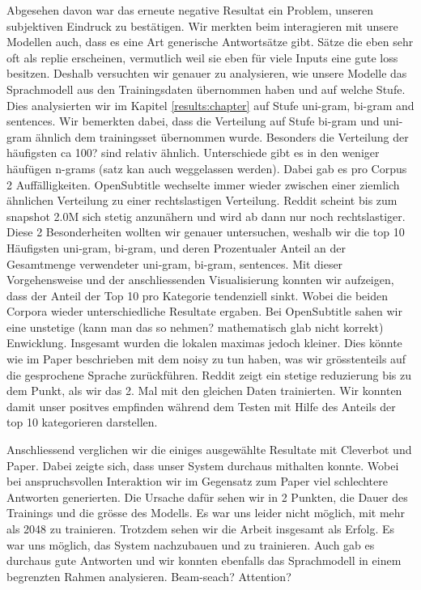 Abgesehen davon war das erneute negative Resultat ein Problem, unseren subjektiven Eindruck zu bestätigen. Wir merkten beim interagieren mit unsere Modellen auch, dass es eine Art generische Antwortsätze gibt. Sätze die eben sehr oft als replie erscheinen, vermutlich weil sie eben für viele Inputs eine gute loss besitzen. Deshalb versuchten wir genauer zu analysieren, wie unsere Modelle das Sprachmodell aus den Trainingsdaten übernommen haben und auf welche Stufe. Dies analysierten wir im Kapitel \ref{results:chapter} auf Stufe uni-gram, bi-gram and sentences. Wir bemerkten dabei, dass die Verteilung auf Stufe bi-gram und uni-gram ähnlich dem trainingsset übernommen wurde. Besonders die Verteilung der häufigsten ca 100? sind relativ ähnlich. Unterschiede gibt es in den weniger häufügen n-grams (satz kan auch weggelassen werden). Dabei gab es pro Corpus 2 Auffälligkeiten. OpenSubtitle wechselte immer wieder zwischen einer ziemlich ähnlichen Verteilung zu einer rechtslastigen Verteilung. Reddit scheint bis zum snapshot 2.0M sich stetig anzunähern und wird ab dann nur noch rechtslastiger. Diese 2 Besonderheiten wollten wir genauer untersuchen, weshalb wir die top 10 Häufigsten uni-gram, bi-gram, und deren Prozentualer Anteil an der Gesamtmenge verwendeter uni-gram, bi-gram, sentences. Mit dieser Vorgehensweise und der anschliessenden Visualisierung konnten wir aufzeigen, dass der Anteil der Top 10 pro Kategorie tendenziell sinkt. Wobei die beiden Corpora wieder unterschiedliche Resultate ergaben. Bei OpenSubtitle sahen wir eine unstetige (kann man das so nehmen? mathematisch glab nicht korrekt) Enwicklung. Insgesamt wurden die lokalen maximas jedoch kleiner. Dies könnte wie im Paper \cite{bibid} beschrieben mit dem noisy zu tun haben, was wir grösstenteils auf die gesprochene Sprache zurückführen. Reddit zeigt ein stetige reduzierung bis zu dem Punkt, als wir das 2. Mal mit den gleichen Daten trainierten. Wir konnten damit unser positves empfinden während dem Testen mit Hilfe des Anteils der top 10 kategorieren darstellen.

Anschliessend verglichen wir die einiges ausgewählte Resultate mit Cleverbot und Paper. Dabei zeigte sich, dass unser System durchaus mithalten konnte. Wobei bei anspruchsvollen Interaktion wir im Gegensatz zum Paper viel schlechtere Antworten generierten. Die Ursache dafür sehen wir in 2 Punkten, die Dauer des Trainings und die grösse des Modells. Es war uns leider nicht möglich, mit mehr als 2048 zu trainieren. Trotzdem sehen wir die Arbeit insgesamt als Erfolg. Es war uns möglich, das System nachzubauen und zu trainieren. Auch gab es durchaus gute Antworten und wir konnten ebenfalls das Sprachmodell in einem begrenzten Rahmen analysieren.
Beam-seach?
Attention?


